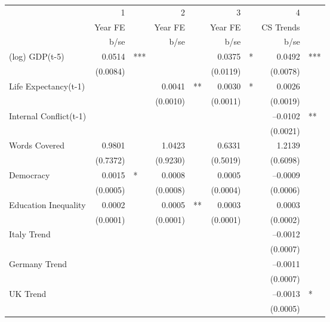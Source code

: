 \begin{tabular} {l* {4}{r @{} l}}
\hline
            &           1&   &           2&   &           3&   &           4&   \\
            &     Year FE&   &     Year FE&   &     Year FE&   &   CS Trends&   \\
            &        b/se&   &        b/se&   &        b/se&   &        b/se&   \\
\hline
(log) GDP(t-5)&      0.0514&***&            &   &      0.0375&*  &      0.0492&***\\
            &    (0.0084)&   &            &   &    (0.0119)&   &    (0.0078)&   \\
Life Expectancy(t-1) &            &   &      0.0041&** &      0.0030&*  &      0.0026&   \\
            &            &   &    (0.0010)&   &    (0.0011)&   &    (0.0019)&   \\
Internal Conflict(t-1)&            &   &            &   &            &   &    --0.0102&** \\
            &            &   &            &   &            &   &    (0.0021)&   \\
Words Covered&      0.9801&   &      1.0423&   &      0.6331&   &      1.2139&   \\
            &    (0.7372)&   &    (0.9230)&   &    (0.5019)&   &    (0.6098)&   \\
Democracy   &      0.0015&*  &      0.0008&   &      0.0005&   &    --0.0009&   \\
            &    (0.0005)&   &    (0.0008)&   &    (0.0004)&   &    (0.0006)&   \\
Education Inequality&      0.0002&   &      0.0005&** &      0.0003&   &      0.0003&   \\
            &    (0.0001)&   &    (0.0001)&   &    (0.0001)&   &    (0.0002)&   \\
Italy Trend &            &   &            &   &            &   &    --0.0012&   \\
            &            &   &            &   &            &   &    (0.0007)&   \\
Germany Trend&            &   &            &   &            &   &    --0.0011&   \\
            &            &   &            &   &            &   &    (0.0007)&   \\
UK Trend    &            &   &            &   &            &   &    --0.0013&*  \\
            &            &   &            &   &            &   &    (0.0005)&   \\

\end{tabular}

